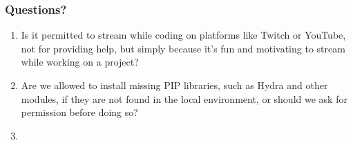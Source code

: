 \documentclass[t,24pt]{beamer}
\begin{document}
\begin{frame}[hoved]
\frametitle{Questions?}
\begin{enumerate}
\item Is it permitted to stream while coding on platforms like Twitch or YouTube, not for providing help, but simply because it’s fun and motivating to stream while working on a project?
\item Are we allowed to install missing PIP libraries, such as Hydra and other modules, if they are not found in the local environment, or should we ask for permission before doing so?
\item 

\end{enumerate}
\end{frame}
\end{document}
